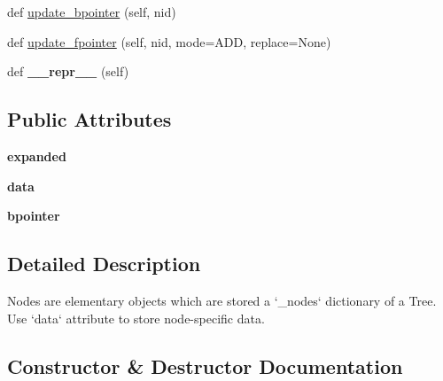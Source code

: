 \begin{DoxyCompactItemize}
\item 
def \mbox{\hyperlink{classapp_1_1main_1_1treelib_1_1node_1_1Node_ad5123f1013b32f2d3fc3c6aa82897a8f}{update\+\_\+bpointer}} (self, nid)
\item 
def \mbox{\hyperlink{classapp_1_1main_1_1treelib_1_1node_1_1Node_a1c2773beab05416bc58d9e5063b58590}{update\+\_\+fpointer}} (self, nid, mode=A\+DD, replace=None)
\item 
\mbox{\label{classapp_1_1main_1_1treelib_1_1node_1_1Node_a208ec50bee77d4ff1d920ecd6cfbf0d1}} 
def {\bfseries \+\_\+\+\_\+repr\+\_\+\+\_\+} (self)
\end{DoxyCompactItemize}
\subsection*{Public Attributes}
\begin{DoxyCompactItemize}
\item 
\mbox{\label{classapp_1_1main_1_1treelib_1_1node_1_1Node_a6a5c835203738fa4fd7f5fdd7358ebbd}} 
{\bfseries expanded}
\item 
\mbox{\label{classapp_1_1main_1_1treelib_1_1node_1_1Node_aec761d3090512fa2151eccd678a36e1a}} 
{\bfseries data}
\item 
\mbox{\label{classapp_1_1main_1_1treelib_1_1node_1_1Node_abba86dbedcc40b7635bdb1fcee1e7f08}} 
{\bfseries bpointer}
\end{DoxyCompactItemize}


\subsection{Detailed Description}
\begin{DoxyVerb}Nodes are elementary objects which are stored a `_nodes` dictionary of a Tree.
Use `data` attribute to store node-specific data.
\end{DoxyVerb}
 

\subsection{Constructor \& Destructor Documentation}
\mbox{\label{classapp_1_1main_1_1treelib_1_1node_1_1Node_aac2165277078b78954b973a74fd68ba6}} 
